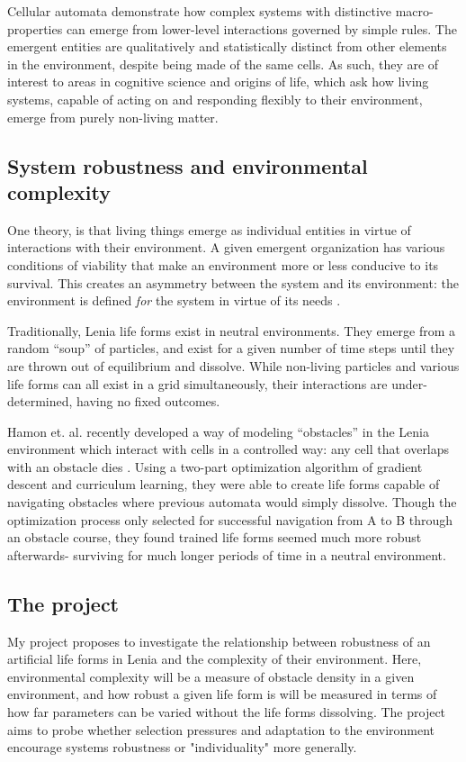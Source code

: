 \documentclass{article}
\begin{document}
Cellular automata  demonstrate how complex systems with distinctive macro-properties can emerge from lower-level interactions governed by simple rules. The emergent entities are qualitatively and statistically distinct from other elements in the environment, despite being made of the same cells. As such, they are of interest to areas in cognitive science and origins of life, which ask how living systems, capable of acting on and responding flexibly to their environment, emerge from purely non-living matter. 

\subsection{System robustness and environmental complexity}
One theory, is that living things emerge as individual entities in virtue of interactions with their environment. A given emergent organization has various conditions of viability that make an environment more or less conducive to its survival. This creates an  asymmetry between the system and its environment: the environment is defined \emph{for} the system in virtue of its needs \cite{di2018enactive} . 

Traditionally, Lenia life forms exist in neutral environments. They emerge from a random “soup” of  particles, and exist for a given number of time steps until they are thrown out of equilibrium and dissolve. While non-living particles and various life forms can all exist in a grid simultaneously, their interactions are under-determined, having no fixed outcomes. 

Hamon et. al. recently developed a way of modeling “obstacles” in the Lenia environment which interact with cells in a controlled way: any cell that overlaps with an obstacle dies \cite{hamon:hal-03519319}. Using a two-part optimization algorithm of gradient descent and curriculum learning, they were able to create life forms capable of navigating obstacles where previous automata would simply dissolve. Though the optimization process only selected for successful navigation from A to B through an obstacle course, they found trained life forms seemed much more robust afterwards- surviving for much longer periods of time in a neutral environment. 

\subsection{The project}
My project proposes to investigate the relationship between robustness of an artificial life forms in Lenia and the complexity of their environment.  Here, environmental complexity will be a measure of obstacle density in a given environment, and how robust a given life form is will be measured in terms of how far parameters can be varied without the life forms dissolving. The project aims to probe whether selection pressures and adaptation to the environment encourage systems robustness or "individuality" more generally.
\end{document}
